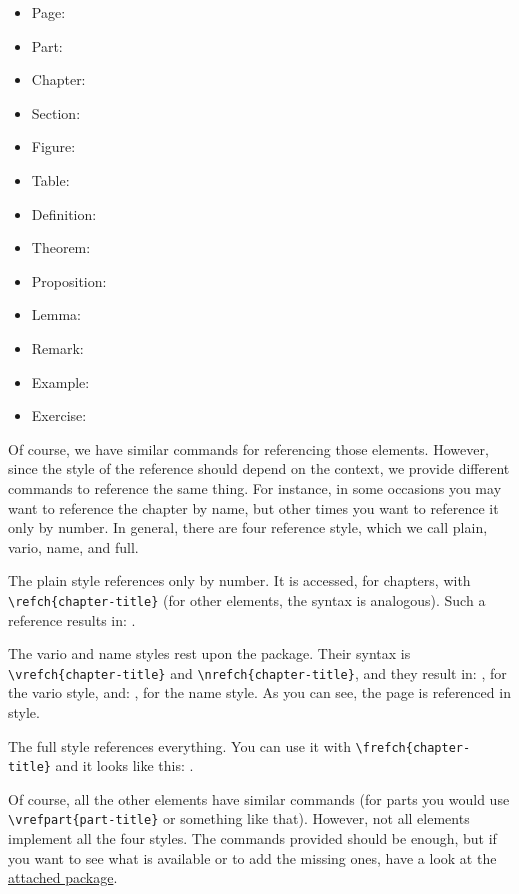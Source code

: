 \begin{multicols}{2}
\setlength{\columnseprule}{0pt}
\begin{itemize}
	\item Page: 
	\item Part: 
	\item Chapter: 
	\item Section: 
	\item Figure: 
	\item Table: 
	\item Definition: 
	\item Theorem: 
	\item Proposition: 
	\item Lemma: 
	\item Remark: 
	\item Example: 
	\item Exercise: 
\end{itemize}
\end{multicols}

Of course, we have similar commands for referencing those elements. 
However, since the style of the reference should depend on the context, 
we provide different commands to reference the same thing. For instance, 
in some occasions you may want to reference the chapter by name, but 
other times you want to reference it only by number. In general, there 
are four reference style, which we call plain, vario, name, and full. 

The plain style references only by number. It is accessed, for chapters, 
with \lstinline|\refch{chapter-title}| (for other elements, the syntax 
is analogous). Such a reference results in: .

The vario and name styles rest upon the  package. 
Their syntax is \lstinline|\vrefch{chapter-title}| and 
\lstinline|\nrefch{chapter-title}|, and they result in: 
, for the vario style, and: , for 
the name style. As you can see, the page is referenced in 
 style.

The full style references everything. You can use it with 
\lstinline|\frefch{chapter-title}| and it looks like this: 
.

Of course, all the other elements have similar commands (\eg for parts 
you would use \lstinline|\vrefpart{part-title}| or something like that). 
However, not all elements implement all the four styles. The commands 
provided should be enough, but if you want to see what is available or 
to add the missing ones, have a look at the 
\href{styles/references.sty}{attached package}.
